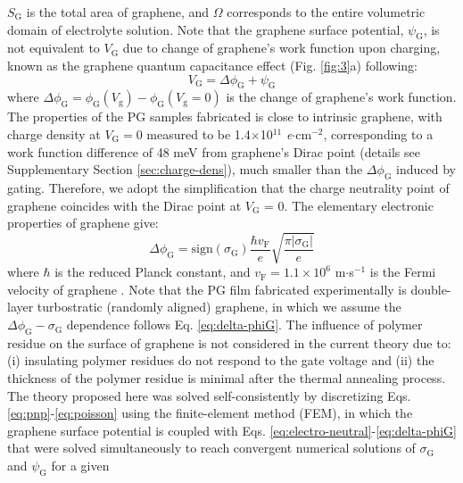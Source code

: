 \documentclass[journal=langd5,email=true, hyperref=true, keywords=false]{achemso}
\begin{document}
$S_{\mathrm{G}}$ is the total area of graphene, and $\Omega$
corresponds to the entire volumetric domain of electrolyte
solution. Note that the graphene surface potential,
$\psi_{\mathrm{G}}$, is not equivalent to $V_{\mathrm{G}}$ due to
change of graphene's work function upon charging, known as the
graphene quantum capacitance effect\cite{Xia_2009} (Fig.
\ref{fig:3}a) following:
\begin{equation}
  \label{eq:Vg}
  V_{\mathrm{G}} = \Delta \phi_{\mathrm{G}} + \psi_{\mathrm{G}}
\end{equation}
where
$\Delta \phi_{\mathrm{G}} = \phi_{\mathrm{G}}(V_{\mathrm{g}}) -
\phi_{\mathrm{G}}(V_{\mathrm{g}}=0)$ is the change of graphene’s work
function. The properties of the PG samples fabricated is close to
intrinsic graphene, with charge density at $V_{\mathrm{G}}=0$ measured
to be 1.4$\times$10$^{11}$ \textit{e}$\cdot$cm$^{-2}$, corresponding
to a work function difference of 48 meV from graphene's Dirac point
(details see Supplementary Section \ref{sec:charge-dens}), much
smaller than the $\Delta \phi_{\mathrm{G}}$ induced by gating.
Therefore, we adopt the simplification that the charge neutrality point
of graphene coincides with the Dirac point at $V_{\mathrm{G}}$ =
0. The elementary electronic properties of graphene give:
\begin{equation}
  \label{eq:delta-phiG}
  \Delta \phi_{\mathrm{G}} = \mathrm{sign}(\sigma_{\mathrm{G}}) \frac{\hbar v_{\mathrm{F}}}{e}
  \sqrt{\frac{\pi |\sigma_{\mathrm{G}}|}{e}}
\end{equation}
where $\hbar$ is the reduced Planck constant, and
$v_{\mathrm{F}}=1.1\times10^{6}$ m$\cdot$s$^{-1}$ is the Fermi
velocity of graphene \cite{Tian_2016}.  Note that the PG film
fabricated experimentally is double-layer turbostratic (randomly
aligned) graphene, in which we assume the
$\Delta \phi_{\mathrm{G}} - \sigma_{\mathrm{G}}$ dependence follows
Eq. \eqref{eq:delta-phiG}. The influence of polymer residue on the
surface of graphene is not considered in the current theory due to:
(i) insulating polymer residues do not respond to the gate voltage and
(ii) the thickness of the polymer residue is minimal after the thermal
annealing process. The theory proposed here was solved
self-consistently by discretizing
Eqs. \eqref{eq:pnp}-\eqref{eq:poisson} using the finite-element method
(FEM), in which the graphene surface potential is coupled with
Eqs. \eqref{eq:electro-neutral}-\eqref{eq:delta-phiG} that were solved
simultaneously to reach convergent numerical solutions of
$\sigma_{\mathrm{G}}$ and $\psi_{\mathrm{G}}$ for a given
\end{document}
